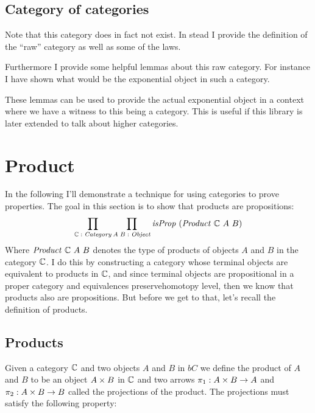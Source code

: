 \subsection{Category of categories}
Note that this category does in fact not exist. In stead I provide the
definition of the ``raw'' category as well as some of the laws.

Furthermore I provide some helpful lemmas about this raw category. For instance
I have shown what would be the exponential object in such a category.

These lemmas can be used to provide the actual exponential object in a context
where we have a witness to this being a category. This is useful if this library
is later extended to talk about higher categories.

\section{Product}
In the following I'll demonstrate a technique for using categories to prove
properties. The goal in this section is to show that products are propositions:
%
$$
\prod_{\mathbb{C} \;\mathord{:}\; \mathit{Category}} \prod_{A\;B \;\mathord{:}\; \mathit{Object}} \mathit{isProp}\ (\mathit{Product}\ \mathbb{C}\ A\ B)
$$
%
Where $\mathit{Product}\ \mathbb{C}\ A\ B$ denotes the type of products of objects $A$
and $B$ in the category $\mathbb{C}$. I do this by constructing a category whose
terminal objects are equivalent to products in $\mathbb{C}$, and since terminal objects
are propositional in a proper category and equivalences preservehomotopy level,
then we know that products also are propositions. But before we get to that,
let's recall the definition of products.

\subsection{Products}
Given a category $\mathbb{C}$ and two objects $A$ and $B$ in $bC$ we define the product
of $A$ and $B$ to be an object $A \times B$ in $\mathbb{C}$ and two arrows $\pi_1 \;\mathord{:}\; A \times
B \to A$ and $\pi_2 \;\mathord{:}\; A \times B \to B$ called the projections of the product. The projections must satisfy the following property:

